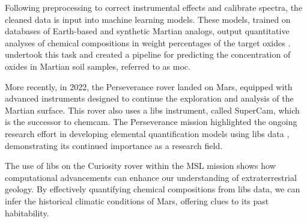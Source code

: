 Following preprocessing to correct instrumental effects and calibrate spectra, the cleaned data is input into machine learning models.
These models, trained on databases of Earth-based and synthetic Martian analogs, output quantitative analyses of chemical compositions in weight percentages of the target oxides \cite{wiensPreflightCalibrationInitial2013, cleggRecalibrationMarsScience2017}.
\citet{cleggRecalibrationMarsScience2017} undertook this task and created a pipeline for predicting the concentration of oxides in Martian soil samples, referred to as \gls{moc}.

More recently, in 2022, the Perseverance rover landed on Mars, equipped with advanced instruments designed to continue the exploration and analysis of the Martian surface.
This rover also uses a \gls{libs} instrument, called SuperCam, which is the successor to \gls{chemcam}.
The Perseverance mission highlighted the ongoing research effort in developing elemental quantification models using \gls{libs} data \cite{andersonPostlandingMajorElement2022}, demonstrating its continued importance as a research field.

The use of \gls{libs} on the Curiosity rover within the MSL mission shows how computational advancements can enhance our understanding of extraterrestrial geology.
By effectively quantifying chemical compositions from \gls{libs} data, we can infer the historical climatic conditions of Mars, offering clues to its past habitability.
